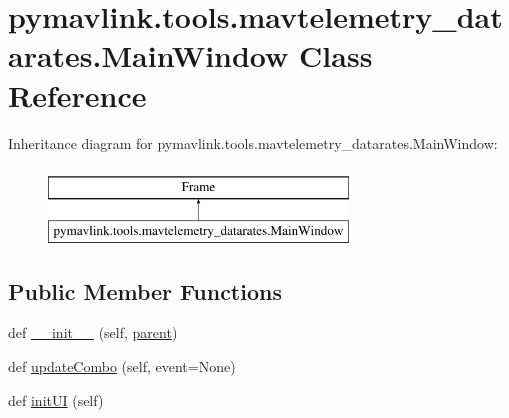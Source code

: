 \hypertarget{classpymavlink_1_1tools_1_1mavtelemetry__datarates_1_1MainWindow}{}\section{pymavlink.\+tools.\+mavtelemetry\+\_\+datarates.\+Main\+Window Class Reference}
\label{classpymavlink_1_1tools_1_1mavtelemetry__datarates_1_1MainWindow}
Inheritance diagram for pymavlink.\+tools.\+mavtelemetry\+\_\+datarates.\+Main\+Window\+:\begin{figure}[H]
\begin{center}
\leavevmode
\includegraphics[height=2.000000cm]{classpymavlink_1_1tools_1_1mavtelemetry__datarates_1_1MainWindow}
\end{center}
\end{figure}
\subsection*{Public Member Functions}
\begin{DoxyCompactItemize}
\item 
def \mbox{\hyperlink{classpymavlink_1_1tools_1_1mavtelemetry__datarates_1_1MainWindow_a3255d9828cde81eb91d8bdf7a907b50b}{\+\_\+\+\_\+init\+\_\+\+\_\+}} (self, \mbox{\hyperlink{classpymavlink_1_1tools_1_1mavtelemetry__datarates_1_1MainWindow_a024185a438507965e75c08edf52510a4}{parent}})
\item 
def \mbox{\hyperlink{classpymavlink_1_1tools_1_1mavtelemetry__datarates_1_1MainWindow_a5f4d9d9e66862f27224c560c220c2787}{update\+Combo}} (self, event=None)
\item 
def \mbox{\hyperlink{classpymavlink_1_1tools_1_1mavtelemetry__datarates_1_1MainWindow_a1e6a1f78b45c7cd2d9134a6c45166bf8}{init\+UI}} (self)
\end{DoxyCompactItemize}

